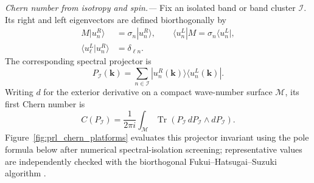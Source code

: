 \documentclass[aps,prl,reprint,superscriptaddress,nofootinbib,floatfix]{revtex4-2}
\begin{document}
\emph{Chern number from isotropy and spin.---}
Fix an isolated band or band cluster $\mathcal I$. Its right and left eigenvectors are defined biorthogonally by
\begin{equation}
  \begin{aligned}
  M|u_n^R\rangle&=\sigma_n|u_n^R\rangle,\qquad
  \langle u_n^L|M=\sigma_n\langle u_n^L|,\\
  \langle u_\ell^L|u_n^R\rangle&=\delta_{\ell n}.
  \end{aligned}
  \label{eq:prl_biorthogonal}
\end{equation}
The corresponding spectral projector is
\begin{equation}
  P_{\mathcal I}(\mathbf k)=
  \sum_{n\in\mathcal I}|u_n^R(\mathbf k)\rangle
  \langle u_n^L(\mathbf k)| .
  \label{eq:prl_projector}
\end{equation}
Writing $d$ for the exterior derivative on a compact wave-number surface $\mathcal M$, its first Chern number is
\begin{equation}
  C(P_{\mathcal I})=\frac{1}{2\pi i}\int_{\mathcal M}
  \operatorname{Tr}\!\left(P_{\mathcal I}\,dP_{\mathcal I}
  \wedge dP_{\mathcal I}\right).
  \label{eq:prl_chern}
\end{equation}
Figure~\ref{fig:prl_chern_platforms} evaluates this projector invariant using the pole formula below after numerical spectral-isolation screening; representative values are independently checked with the biorthogonal Fukui--Hatsugai--Suzuki algorithm \cite{Fukui2005}.
\end{document}
